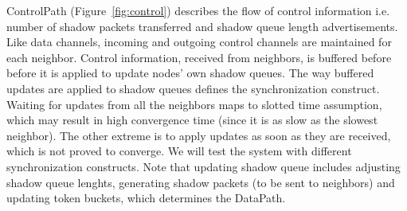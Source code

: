 ControlPath (Figure~\ref{fig:control}) describes the flow of control information i.e. number of shadow packets transferred and shadow queue length advertisements. Like data channels, incoming and outgoing control channels are maintained for each neighbor. Control information, received from neighbors, is buffered before before it is applied to update nodes' own shadow queues. The way buffered updates are applied to shadow queues defines the synchronization construct. Waiting for updates from all the neighbors maps to slotted time assumption, which may result in high convergence time (since it is as slow as the slowest neighbor). The other extreme is to apply updates as soon as they are received, which is not proved to converge. We will test the system with different synchronization constructs. Note that updating shadow queue includes adjusting shadow queue lenghts, generating shadow packets (to be sent to neighbors) and updating token buckets, which determines the DataPath.

